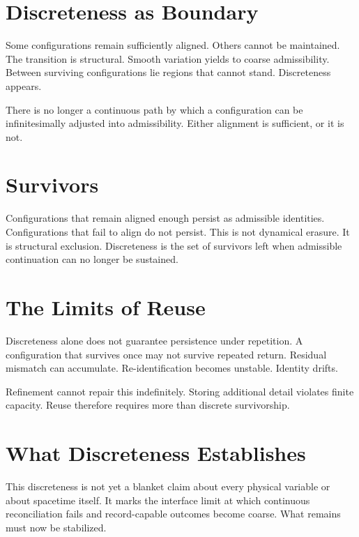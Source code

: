 \documentclass[11pt,twoside,openright]{book}
\begin{document}
\section*{Discreteness as Boundary}

Some configurations remain sufficiently aligned. Others cannot be maintained. The transition is structural. Smooth variation yields to coarse admissibility. Between surviving configurations lie regions that cannot stand. Discreteness appears.

There is no longer a continuous path by which a configuration can be infinitesimally adjusted into admissibility. Either alignment is sufficient, or it is not.

\section*{Survivors}

Configurations that remain aligned enough persist as admissible identities. Configurations that fail to align do not persist. This is not dynamical erasure. It is structural exclusion. Discreteness is the set of survivors left when admissible continuation can no longer be sustained.

\section*{The Limits of Reuse}

Discreteness alone does not guarantee persistence under repetition. A configuration that survives once may not survive repeated return. Residual mismatch can accumulate. Re-identification becomes unstable. Identity drifts.

Refinement cannot repair this indefinitely. Storing additional detail violates finite capacity. Reuse therefore requires more than discrete survivorship.

\section*{What Discreteness Establishes}

This discreteness is not yet a blanket claim about every physical variable or about spacetime itself. It marks the interface limit at which continuous reconciliation fails and record-capable outcomes become coarse. What remains must now be stabilized.
\end{document}
